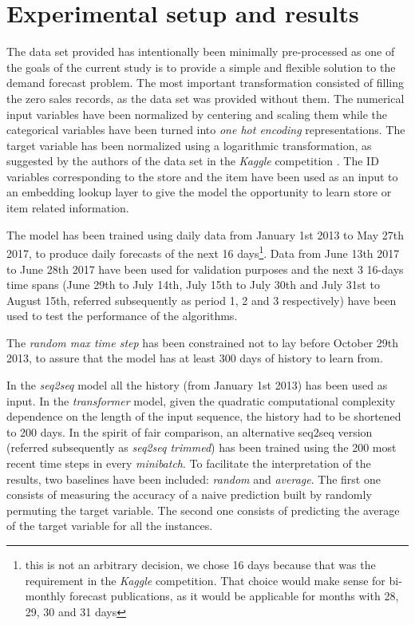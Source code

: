 \documentclass{elsarticle}
\begin{document}
	\section{Experimental setup and results} \label{sec:results}
	The data set provided has intentionally been minimally pre-processed as one of the goals of the current study is to provide a simple and flexible solution to the demand forecast problem. The most important transformation consisted of filling the zero sales records, as the data set was provided without them. The numerical input variables have been normalized by centering and scaling them while the categorical variables have been turned into \textit{one hot encoding} representations. The target variable has been normalized using a logarithmic transformation, as suggested by the authors of the data set in the \textit{Kaggle} competition \cite{corporacionfavoritadataset2018}. The ID variables corresponding to the store and the item have been used as an input to an embedding lookup layer to give the model the opportunity to learn store or item related information.
	
	The model has been trained using daily data from January 1st 2013 to May 27th 2017, to produce daily forecasts of the next 16 days\footnote{this is not an arbitrary decision, we chose 16 days because that was the requirement in the \textit{Kaggle} competition. That choice would make sense for bi-monthly forecast publications, as it would be applicable for months with 28, 29, 30 and 31 days}. Data from  June 13th 2017 to June 28th 2017 have been used for validation purposes and the next 3 16-days time spans (June 29th to July 14th, July 15th to July 30th and July 31st to August 15th, referred subsequently as period 1, 2 and 3 respectively) have been used to test the performance of the algorithms.
	
	 The \textit{random max time step} has been constrained not to lay before October 29th 2013, to assure that the model has at least 300 days of history to learn from. 
	
	In the \textit{seq2seq} model all the history (from January 1st 2013) has been used as input.  In the \textit{transformer} model, given the quadratic computational complexity dependence on the length of the input sequence, the history had to be shortened to 200 days. In the spirit of fair comparison, an alternative seq2seq version (referred subsequently as \textit{seq2seq trimmed}) has been trained using the 200 most recent time steps in every \textit{minibatch}. To facilitate the interpretation of the results, two baselines have been included: \textit{random} and \textit{average}. The first one consists of measuring the accuracy of a naive prediction built by randomly permuting the target variable. The second one consists of predicting the average of the target variable for all the instances. 
	
\end{document}
